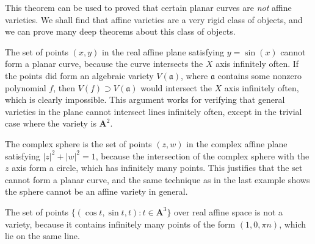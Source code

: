 This theorem can be used to proved that certain planar curves are {\it not} affine varieties. We shall find that affine varieties are a very rigid class of objects, and we can prove many deep theorems about this class of objects.

\begin{example}
    The set of points $(x,y)$ in the real affine plane satisfying $y = \sin(x)$ cannot form a planar curve, because the curve intersects the $X$ axis infinitely often. If the points did form an algebraic variety $V(\mathfrak{a})$, where $\mathfrak{a}$ contains some nonzero polynomial $f$, then $V(f) \supset V(\mathfrak{a})$ would intersect the $X$ axis infinitely often, which is clearly impossible. This argument works for verifying that general varieties in the plane cannot intersect lines infinitely often, except in the trivial case where the variety is $\mathbf{A}^2$.
\end{example}

\begin{example}
    The complex sphere is the set of points $(z,w)$ in the complex affine plane satisfying $|z|^2 + |w|^2 = 1$, because the intersection of the complex sphere with the $z$ axis form a circle, which has infinitely many points. This justifies that the set cannot form a planar curve, and the same technique as in the last example shows the sphere cannot be an affine variety in general.
\end{example}

\begin{example}
    The set of points $\{ (\cos t, \sin t, t): t \in \mathbf{A}^3 \}$ over real affine space is not a variety, because it contains infinitely many points of the form $(1,0,\pi n)$, which lie on the same line.
\end{example}

